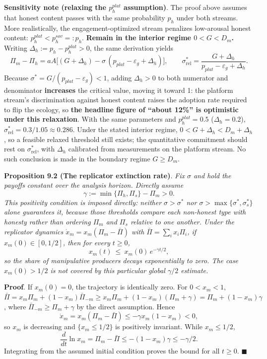 \documentclass[
  11pt]{article}
\begin{document}
\textbf{Sensitivity note (relaxing the \(p_h^{plat}\) assumption)}. The
proof above assumes that honest content passes with the same probability
\(p_h\) under both streams. More realistically, the engagement-optimized
stream penalizes low-arousal honest content:
\(p_h^{plat} < p_h^{sov} =: p_h\). \textbf{Remain in the interior regime
\(0<G<D_m\).} Writing \(\Delta_h := p_h - p_h^{plat} > 0\), the same
derivation yields
\[\Pi_m - \Pi_h = aA\big[(G + \Delta_h) - \sigma\,(p_{plat} - \varepsilon_g + \Delta_h)\big], \qquad \sigma^*_{\mathrm{rel}} = \frac{G + \Delta_h}{p_{plat} - \varepsilon_g + \Delta_h}.\]
Because \(\sigma^* = G/(p_{plat}-\varepsilon_g) < 1\), adding
\(\Delta_h > 0\) to both numerator and denominator \textbf{increases}
the critical value, moving it toward 1: the platform stream's
discrimination against honest content raises the adoption rate required
to flip the ecology, so \textbf{the headline figure of ``about 12\%'' is
optimistic under this relaxation}. With the same parameters and
\(p_h^{plat} = 0.5\) (\(\Delta_h = 0.2\)),
\(\sigma^*_{\mathrm{rel}} = 0.3/1.05 \approx 0.286\). Under the stated
interior regime, \(0<G+\Delta_h<D_m+\Delta_h\), so a feasible relaxed
threshold still exists; the quantitative commitment should rest on
\(\sigma^*_{\mathrm{rel}}\), with \(\Delta_h\) calibrated from
measurements on the platform stream. No such conclusion is made in the
boundary regime \(G\ge D_m\).

\textbf{Proposition 9.2 (The replicator extinction rate)}. \emph{Fix
\(\sigma\) and hold the payoffs constant over the analysis horizon.
Directly assume} \[\gamma := \min\{\Pi_h, \Pi_s\} - \Pi_m > 0.\]
\emph{This positivity condition is imposed directly: neither
\(\sigma>\sigma^*\) nor \(\sigma>\max\{\sigma^*,\sigma_s^*\}\) alone
guarantees it, because those thresholds compare each non-honest type
with honesty rather than ordering \(\Pi_m\) and \(\Pi_s\) relative to
one another. Under the replicator dynamics
\(\dot x_m = x_m(\Pi_m - \bar\Pi)\) with \(\bar\Pi = \sum_i x_i \Pi_i\),
if \(x_m(0)\in[0,1/2]\), then for every \(t\ge0\),}
\[x_m(t) \ \le\ x_m(0)\, e^{-\gamma t/2},\] \emph{so the share of
manipulative producers decays exponentially to zero. The case
\(x_m(0)>1/2\) is not covered by this particular global \(\gamma/2\)
estimate.}

\textbf{Proof}. If \(x_m(0)=0\), the trajectory is identically zero. For
\(0<x_m<1\),
\(\bar\Pi = x_m \Pi_m + (1-x_m)\bar\Pi_{-m} \ge x_m\Pi_m + (1-x_m)(\Pi_m + \gamma) = \Pi_m + (1-x_m)\gamma\),
where \(\bar\Pi_{-m}\ge\Pi_m+\gamma\) by the direct assumption. Hence
\[\dot x_m=x_m(\Pi_m-\bar\Pi)\le-\gamma x_m(1-x_m)<0,\] so \(x_m\) is
decreasing and \(\{x_m\le1/2\}\) is positively invariant. While
\(x_m\le1/2\),
\[\frac{d}{dt}\ln x_m = \Pi_m - \bar\Pi \le -(1-x_m)\gamma \le -\gamma/2.\]
Integrating from the assumed initial condition proves the bound for all
\(t\ge0\). \(\blacksquare\)
\end{document}
